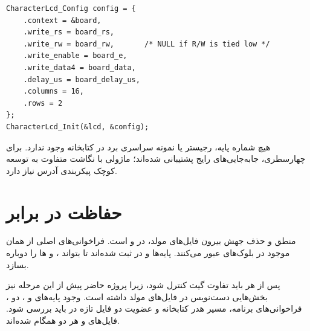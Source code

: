 \begin{latin}
\begin{lstlisting}
CharacterLcd_Config config = {
    .context = &board,
    .write_rs = board_rs,
    .write_rw = board_rw,       /* NULL if R/W is tied low */
    .write_enable = board_e,
    .write_data4 = board_data,
    .delay_us = board_delay_us,
    .columns = 16,
    .rows = 2
};
CharacterLcd_Init(&lcd, &config);
\end{lstlisting}
\end{latin}

هیچ شماره پایه، رجیستر  یا نمونه سراسری برد در کتابخانه وجود ندارد. برای  چهارسطری، جابه‌جایی‌های رایج  پشتیبانی شده‌اند؛ ماژولی با نگاشت متفاوت به توسعه کوچک پیکربندی آدرس نیاز دارد.

\section{حفاظت در برابر }
منطق  و حذف جهش بیرون فایل‌های مولد، در  و  است. فراخوانی‌های اصلی از همان  موجود در بلوک‌های  عبور می‌کنند. پایه‌ها و  در  ثبت شده‌اند تا  بتواند ،  و ها را دوباره بسازد.

پس از هر  باید تفاوت گیت کنترل شود، زیرا پروژه حاضر پیش از این مرحله نیز بخش‌هایی دست‌نویس در فایل‌های مولد داشته است. وجود پایه‌های  و ، دو ، فراخوانی‌های برنامه، مسیر هدر کتابخانه و عضویت دو فایل تازه در  باید بررسی شود. فایل‌های  و  هر دو همگام شده‌اند.

